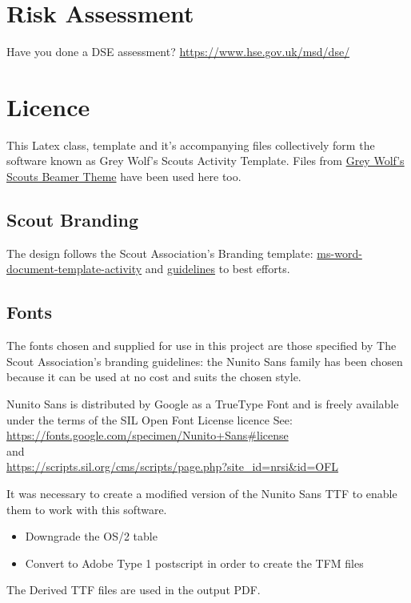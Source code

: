 \documentclass[a4paper]{GreyWolfsScoutActivityTemplate}
\begin{document}
\section*{Risk Assessment}
\label{RA}
Have you done a DSE assessment? \href{https://www.hse.gov.uk/msd/dse/}{https://www.hse.gov.uk/msd/dse/}



\section*{Licence}
This Latex class, template and it's accompanying files collectively form the software known as Grey Wolf's Scouts Activity Template. Files from \href{https://github.com/nimpo/GreyWolfsScoutsBeamerTheme}{Grey Wolf's Scouts Beamer Theme} have been used here too.

\subsection*{Scout Branding}
The design follows the Scout Association's Branding template: \href{https://scoutsbrand.org.uk/catalogue/item/ms-word-document-template-activity}{ms-word-document-template-activity} and \href{https://docs.scoutsbrand.org.uk/guidelines.pdf}{guidelines} to best efforts.

\subsection*{Fonts}
The fonts chosen and supplied for use in this project are those specified by The Scout Association's branding guidelines: the Nunito Sans family has been chosen because it can be used at no cost and suits the chosen style.

Nunito Sans is distributed by Google as a TrueType Font and is freely
available under the terms of the SIL Open Font License licence
See:\\\href{https://fonts.google.com/specimen/Nunito+Sans\#license}{https://fonts.google.com/specimen/Nunito+Sans\#license}\\and\\\href{https://scripts.sil.org/cms/scripts/page.php?site_id=nrsi&id=OFL}{https://scripts.sil.org/cms/scripts/page.php?site\_id=nrsi\&id=OFL}

It was necessary to create a modified version of the Nunito Sans TTF to
enable them to work with this software.
\begin{itemize}
\item Downgrade the OS/2 table
\item Convert to Adobe Type 1 postscript in order to create the TFM files
\end{itemize}
The Derived TTF files are used in the output PDF.
\end{document}
